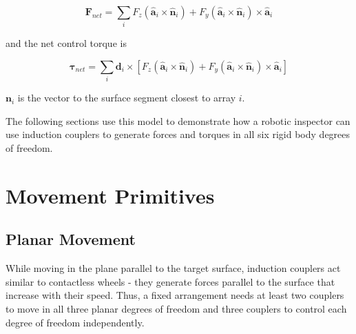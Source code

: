 \documentclass[letterpaper, 10 pt, conference]{ieeeconf}  %
\begin{document}
 \begin{equation}
 \label{eq:Fnet }
  \textbf{F}_{net} =  \sum_{i} F_z \left(\hat{\textbf{a}}_i \times \hat{\textbf{n}}_i \right) 
		+ F_y \left(\hat{\textbf{a}}_i \times \hat{\textbf{n}}_i \right) \times \hat{\textbf{a}}_i
 \end{equation}
 
 and the net control torque is
 
 \begin{equation}
 \label{Tnet}
 \boldsymbol{\tau}_{net} =  \sum_{i} \textbf{d}_i \times [F_z \left(\hat{\textbf{a}}_i \times \hat{\textbf{n}}_i \right) 
		+ F_y \left(\hat{\textbf{a}}_i \times \hat{\textbf{n}}_i \right) \times \hat{\textbf{a}}_i]
 \end{equation}

 $\textbf{n}_i$ is the vector to the surface segment closest to array $i$.   
 
\par The following sections use this model to demonstrate how a robotic inspector can use induction couplers to generate forces and torques in all six rigid body degrees of freedom.

%

\section{Movement Primitives}\label{sec:movements}
\subsection{Planar Movement}\label{sec:planar_movement_desc}
\par While moving in the plane parallel to the target surface, induction couplers act similar to contactless wheels - they generate forces parallel to the surface that increase with their speed. Thus, a fixed arrangement needs at least two couplers to move in all three planar degrees of freedom and three couplers to control each degree of freedom independently.    
% 
\end{document}
